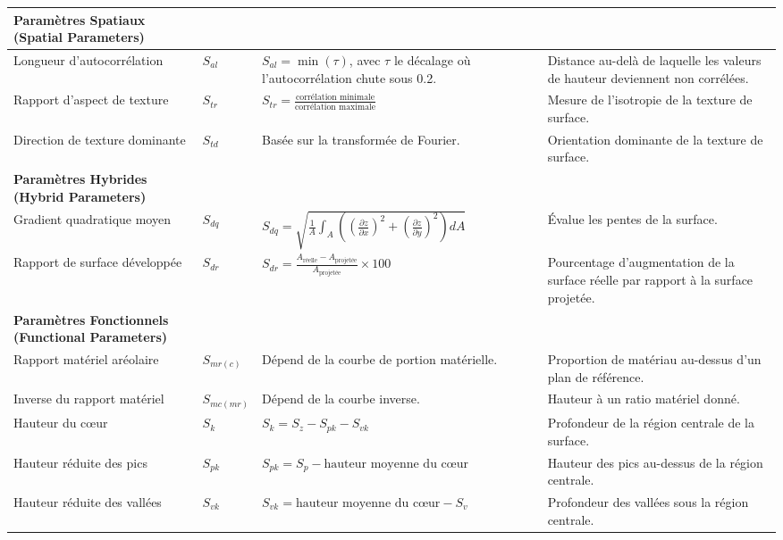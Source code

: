 \begin{longtable}{|p{3.5cm}|p{1.5cm}|p{6cm}|p{6cm}|}
    \textbf{Paramètres Spatiaux (Spatial Parameters)} & & & \\ \hline
    Longueur d’autocorrélation & $S_{al}$ & $S_{al} = \min(\tau)$, avec $\tau$ le décalage où l’autocorrélation chute sous 0.2. & Distance au-delà de laquelle les valeurs de hauteur deviennent non corrélées. \\ \hline
    Rapport d’aspect de texture & $S_{tr}$ & $S_{tr} = \frac{\text{corrélation minimale}}{\text{corrélation maximale}}$ & Mesure de l’isotropie de la texture de surface. \\ \hline
    Direction de texture dominante & $S_{td}$ & Basée sur la transformée de Fourier. & Orientation dominante de la texture de surface. \\ \hline

    \textbf{Paramètres Hybrides (Hybrid Parameters)} & & & \\ \hline
    Gradient quadratique moyen & $S_{dq}$ & $S_{dq} = \sqrt{\frac{1}{A} \int_A \left( \left( \frac{\partial z}{\partial x} \right)^2 + \left( \frac{\partial z}{\partial y} \right)^2 \right) dA}$ & Évalue les pentes de la surface. \\ \hline
    Rapport de surface développée & $S_{dr}$ & $S_{dr} = \frac{A_{\text{réelle}} - A_{\text{projetée}}}{A_{\text{projetée}}} \times 100$ & Pourcentage d’augmentation de la surface réelle par rapport à la surface projetée. \\ \hline

    \textbf{Paramètres Fonctionnels (Functional Parameters)} & & & \\ \hline
    Rapport matériel aréolaire & $S_{mr(c)}$ & Dépend de la courbe de portion matérielle. & Proportion de matériau au-dessus d’un plan de référence. \\ \hline
    Inverse du rapport matériel & $S_{mc(mr)}$ & Dépend de la courbe inverse. & Hauteur à un ratio matériel donné. \\ \hline
    Hauteur du cœur & $S_k$ & $S_k = S_z - S_{pk} - S_{vk}$ & Profondeur de la région centrale de la surface. \\ \hline
    Hauteur réduite des pics & $S_{pk}$ & $S_{pk} = S_p - \text{hauteur moyenne du cœur}$ & Hauteur des pics au-dessus de la région centrale. \\ \hline
    Hauteur réduite des vallées & $S_{vk}$ & $S_{vk} = \text{hauteur moyenne du cœur} - S_v$ & Profondeur des vallées sous la région centrale. \\ \hline


\end{longtable}
